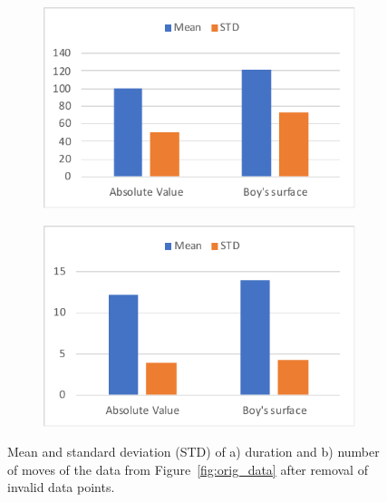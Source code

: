 \documentclass[hyperref, plainreport, noproblem]{cgvpub1}
\begin{document}
\begin{figure}[ht]
    \centering
    \begin{subfigure}[b]{0.45\textwidth}
    	\includegraphics[width = \columnwidth]{time_avg}
	 \caption{ }
    \end{subfigure}
    \begin{subfigure}[b]{0.45\textwidth}
    	\includegraphics[width = \columnwidth]{move_avg}
	 \caption{}
    \end{subfigure}
    \caption{Mean and standard deviation (STD) of a) duration and b) number of moves of the data from Figure~\ref{fig:orig_data} after removal of invalid data points.}
    \label{fig:avg_data}
\end{figure}
\end{document}
